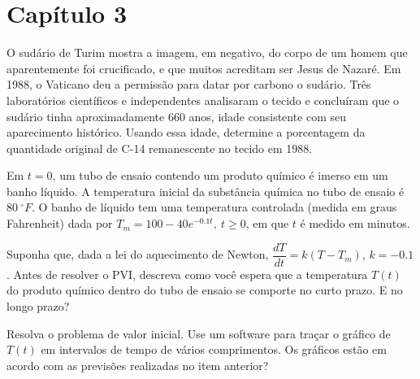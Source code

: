 \documentclass[oneside,12pt,a4paper]{report}
\begin{document}
%


\chapter*{Capítulo 3}

     O sudário de Turim mostra a imagem, em negativo, do corpo de um homem que aparentemente foi crucificado, e que muitos acreditam ser Jesus de Nazaré. Em 1988, o Vaticano deu a permissão para datar por carbono o sudário. Três laboratórios científicos e independentes analisaram o tecido e concluíram que o sudário tinha aproximadamente 660 anos, idade consistente com seu aparecimento histórico. Usando essa idade, determine a porcentagem da quantidade original de C-14 remanescente no tecido em 1988.

    \begin{resolucao}
        
    \end{resolucao}

     Em $t=0$, um tubo de ensaio contendo um produto químico é imerso em um banho líquido. A temperatura inicial da substância química no tubo de ensaio é $80~^\circ F$. O banho de líquido tem uma temperatura controlada (medida em graus Fahrenheit) dada por $T_m=100-40e^{-0.1t},~t\geq0$, em que $t$ é medido em minutos.
    \begin{itensquestao}[1]
        \item Suponha que, dada a lei do aquecimento de Newton, $\dfrac{dT}{dt}=k(T-T_m)$, $k=-0.1$. Antes de resolver o PVI, descreva como você espera que a temperatura $T(t)$ do produto químico dentro do tubo de ensaio se comporte no curto prazo. E no longo prazo?
        \item Resolva o problema de valor inicial. Use um software para traçar o gráfico de $T(t)$ em intervalos de tempo de vários comprimentos. Os gráficos estão em acordo com as previsões realizadas no item anterior?
    \end{itensquestao}

    \begin{resolucao}
        
    \end{resolucao}
\end{document}
